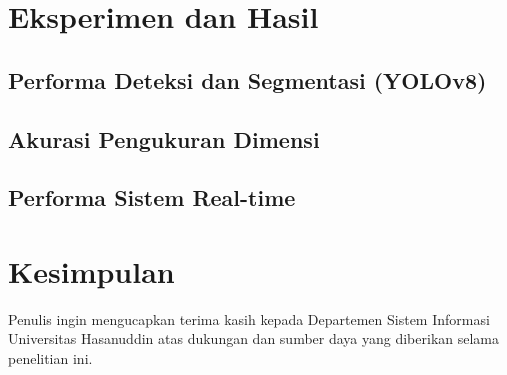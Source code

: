 \documentclass{iopjournal}
\begin{document}
\section{Eksperimen dan Hasil}

\subsection{Performa Deteksi dan Segmentasi (YOLOv8)}

\subsection{Akurasi Pengukuran Dimensi}

\subsection{Performa Sistem Real-time}

\section{Kesimpulan}
\label{sec:conclusion}

\ack
Penulis ingin mengucapkan terima kasih kepada Departemen Sistem Informasi Universitas Hasanuddin atas dukungan dan sumber daya yang diberikan selama penelitian ini.
\end{document}
